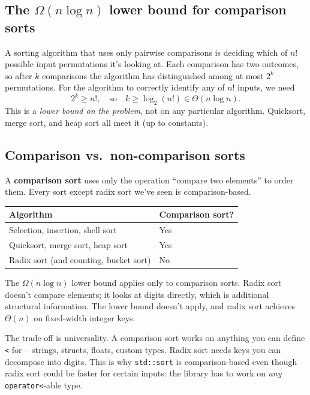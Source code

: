 \documentclass[11pt]{article}
\begin{document}
\subsection{The $\Omega(n \log n)$ lower bound for comparison sorts}

\begin{ideabox}
A sorting algorithm that uses only pairwise comparisons is deciding
which of $n!$ possible input permutations it's looking at. Each
comparison has two outcomes, so after $k$ comparisons the algorithm
has distinguished among at most $2^k$ permutations. For the
algorithm to correctly identify any of $n!$ inputs, we need
\[
    2^k \ge n!,
    \quad\text{so}\quad
    k \ge \log_2(n!) \in \Theta(n \log n).
\]
This is a \emph{lower bound on the problem}, not on any particular
algorithm. Quicksort, merge sort, and heap sort all meet it (up to
constants).
\end{ideabox}

\subsection{Comparison vs.\ non-comparison sorts}

\begin{defnbox}
A \textbf{comparison sort} uses only the operation ``compare two
elements'' to order them. Every sort except radix sort we've seen is
comparison-based.
\end{defnbox}

\begin{center}
\footnotesize
\renewcommand{\arraystretch}{1.3}
\begin{tabular}{@{}ll@{}}
\hline
\textbf{Algorithm} & \textbf{Comparison sort?} \\
\hline
Selection, insertion, shell sort      & Yes \\
Quicksort, merge sort, heap sort       & Yes \\
Radix sort (and counting, bucket sort) & No \\
\hline
\end{tabular}
\end{center}

\begin{ideabox}
The $\Omega(n \log n)$ lower bound applies only to comparison sorts.
Radix sort doesn't compare elements; it looks at digits directly,
which is additional structural information. The lower bound doesn't
apply, and radix sort achieves $\Theta(n)$ on fixed-width integer
keys.

The trade-off is universality. A comparison sort works on anything
you can define \texttt{<} for -- strings, structs, floats, custom
types. Radix sort needs keys you can decompose into digits. This is
why \texttt{std::sort} is comparison-based even though radix sort
could be faster for certain inputs: the library has to work on
\emph{any} \texttt{operator<}-able type.
\end{ideabox}
\end{document}
